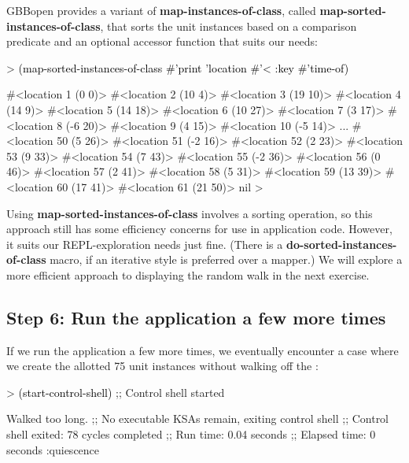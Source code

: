 \documentclass[10pt,twoside,english,pdftex]{article}
\begin{document}
%
GBBopen provides a variant of \textbf{map-instances-of-class}, called
\textbf{map-sorted-instances-of-class}, that sorts the unit instances based on
a comparison predicate and an optional  accessor function that
suits our needs:
%
\begin{example}\color{darkergray}%
  > \textcolor{black}{(map-sorted-instances-of-class #'print 'location #'< 
       :key #'time-of)}

  #<location 1 (0 0)> 
  #<location 2 (10 4)> 
  #<location 3 (19 10)> 
  #<location 4 (14 9)> 
  #<location 5 (14 18)> 
  #<location 6 (10 27)> 
  #<location 7 (3 17)> 
  #<location 8 (-6 20)> 
  #<location 9 (4 15)> 
  #<location 10 (-5 14)> 
       ...
  #<location 50 (5 26)> 
  #<location 51 (-2 16)> 
  #<location 52 (2 23)> 
  #<location 53 (9 33)> 
  #<location 54 (7 43)> 
  #<location 55 (-2 36)> 
  #<location 56 (0 46)> 
  #<location 57 (2 41)> 
  #<location 58 (5 31)> 
  #<location 59 (13 39)> 
  #<location 60 (17 41)> 
  #<location 61 (21 50)> 
  nil
  >
\end{example}

%
Using \textbf{map-sorted-instances-of-class} involves a sorting operation, so
this approach still has some efficiency concerns for use in application code.
However, it suits our REPL-exploration needs just fine.  (There is a
\textbf{do-sorted-instances-of-class} macro, if an iterative style is
preferred over a mapper.)  We will explore a more efficient approach to
displaying the random walk in the next exercise.

\subsection*{Step 6:  Run the application a few more times}

%
If we run the application a few more times, we eventually encounter a case
where we create the allotted 75  unit instances without walking
off the :
%
\begin{example}\color{darkergray}%
  > \textcolor{black}{(start-control-shell)}
  ;; Control shell started

  Walked too long.
  ;; No executable KSAs remain, exiting control shell
  ;; Control shell exited: 78 cycles completed
  ;; Run time: 0.04 seconds
  ;; Elapsed time: 0 seconds
  :quiescence
\end{example}
\end{document}
